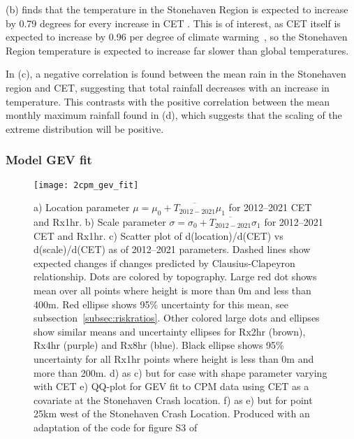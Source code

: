 (b) finds that the temperature in the Stonehaven Region is expected to increase by 0.79 degrees for every increase
    in CET .
This is of interest, as CET itself is expected to increase by 0.96 per degree of climate warming~\cite{Tett_Soon},
    so the Stonehaven Region temperature is expected to increase far slower than global temperatures.

In (c),
    a negative correlation is found between the mean rain in the Stonehaven region and CET,
    suggesting that total rainfall decreases with an increase in temperature.
This contrasts with the positive correlation between the mean monthly maximum rainfall found in (d),
    which suggests that the scaling of the extreme distribution will be positive.

\subsubsection{Model GEV fit}

\begin{figure}[H]
    \centering
    \texttt{[image: 2cpm\_gev\_fit]}
    \caption[a) Location parameter $\mu = \mu_0 + \overline{T_{2012-2021}}\mu_1$  for 2012--2021 CET and Rx1hr.
    b) Scale parameter $\sigma = \sigma_0 + \overline{T_{2012-2021}}\sigma_1$ for 2012--2021 CET and Rx1hr.
    c) Scatter plot of d(location)/d(CET) vs d(scale)/d(CET) as of 2012--2021 parameters.
    d) as c) but for case with shape parameter varying with CET.
    e) QQ-plot for GEV fit to CPM data using CET as a covariate at the Stonehaven Crash location.
    f) as e) but for point 25km west of the Stonehaven Crash Location.]{
        a) Location parameter $\mu = \mu_0 + \overline{T_{2012-2021}}\mu_1$  for 2012--2021 CET and Rx1hr.
    b) Scale parameter $\sigma = \sigma_0 + \overline{T_{2012-2021}}\sigma_1$ for 2012--2021 CET and Rx1hr.
    c) Scatter plot of d(location)/d(CET) vs d(scale)/d(CET) as of 2012--2021 parameters.
    Dashed lines show expected changes if changes predicted by Clausius-Clapeyron relationship.
    Dots are colored by topography.
    Large red dot shows mean over all points where height is more than 0m and less than 400m.
    Red ellipse shows 95\% uncertainty for this mean, see subsection~\ref{subsec:riskratios}.
    Other colored large dots and ellipses show similar means and uncertainty ellipses for Rx2hr (brown), Rx4hr (purple) and Rx8hr (blue).
    Black ellipse shows 95\% uncertainty for all Rx1hr points where height is less than 0m and more than 200m.
    d) as c) but for case with shape parameter varying with CET
    e) QQ-plot for GEV fit to CPM data using CET as a covariate at the Stonehaven Crash location.
    f) as e) but for point 25km west of the Stonehaven Crash Location.
    Produced with an adaptation of the code for figure S3 of~\cite{Tett_Soon}}
    \label{fig:2cpm_gev_fit}
\end{figure}

